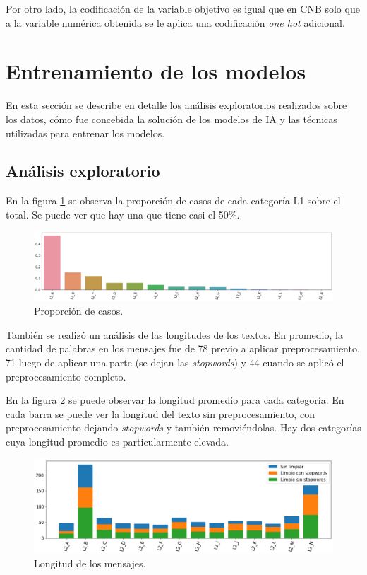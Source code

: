 Por otro lado, la codificación de la variable objetivo es igual que en CNB solo que a la variable numérica obtenida se le aplica una codificación \textit{one hot} adicional.

\section{Entrenamiento de los modelos}

En esta sección se describe en detalle los análisis exploratorios realizados sobre los datos, cómo fue concebida la solución de los modelos de IA y las técnicas utilizadas para entrenar los modelos.

\subsection{Análisis exploratorio}

En la figura \ref{fig:cap3-distribucion} se observa la proporción de casos de cada categoría L1 sobre el total. Se puede ver que hay una que tiene casi el 50\%.

\begin{figure}[htb]
	\centering
	\includegraphics[width=1\textwidth]{./Figures/cap3-distribucion.png}
	\caption{Proporción de casos.}
	\label{fig:cap3-distribucion}
\end{figure}

También se realizó un análisis de las longitudes de los textos. En promedio, la cantidad de palabras en los mensajes fue de 78 previo a aplicar preprocesamiento, 71 luego de aplicar una parte (se dejan las \textit{stopwords}) y 44 cuando se aplicó el preprocesamiento completo.

En la figura \ref{fig:cap3-longitudes} se puede observar la longitud promedio para cada categoría. En cada barra se puede ver la longitud del texto sin preprocesamiento, con preprocesamiento dejando \textit{stopwords} y también removiéndolas. Hay dos categorías cuya longitud promedio es particularmente elevada.

\begin{figure}[htbp]
	\centering
	\includegraphics[width=1\textwidth]{./Figures/cap3-longitudes.png}
	\caption{Longitud de los mensajes.}
	\label{fig:cap3-longitudes}
\end{figure}

